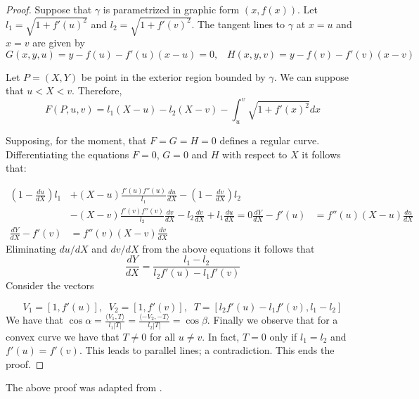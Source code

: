 \begin{proof}
Suppose that $\gamma$ is parametrized in graphic
form $(x,f(x))$. Let $l_1=\sqrt{1+f'(u)^2}$ and
$l_2=\sqrt{1+f'(v)^2}$.
The tangent lines to $\gamma$ at $x=u$ and $x=v$
are given by
\[ G(x,y,u)=y-f(u)-f'(u)(x-u)=0,\;\;\; H(x,y,v)=y-f(v)-f'(v)(x-v)\]

Let $P=(X,Y)$ be  point in the exterior region bounded by $\gamma$. We can suppose that $u<X<v.$
Therefore, 
\[F(P,u,v)=l_1(X-u)-l_2(X-v)-\int_u^v \sqrt{1+f'(x)^2}dx \]

Supposing, for the moment,  that $F=G=H=0$ defines  a regular curve.  Differentiating the equations $F=0$, $G=0$ and $H$ with respect to $X$ it follows that:

\begin{align*}
(1-\frac{du}{dX})l_1 &+(X-u)\frac{f'(u)f''(u)}{l_1}\frac{du}{dX}-(1-\frac{dv}{dX})l_2\\
    &-(X-v)\frac{f'(v)f''(v)}{l_2}\frac{dv}{dX}-l_2\frac{dv}{dX}+l_1\frac{du}{dX}=0
    \frac{dY}{dX}-f'(u)&=f''(u)(X-u)\frac{du}{dX}\\
    \frac{dY}{dX}-f'(v)&=f''(v)(X-v)\frac{dv}{dX}
\end{align*}
Eliminating $du/dX$ and $dv/dX$ from the above equations   it follows that
\[\frac{dY}{dX}=\frac{l_1-l_2}{l_2f'(u)-l_1f'(v)}\]
Consider the vectors

\[V_1=[1,f'(u)],\;\; V_2=[1,f'(v)],\;\; 
T=[l_2f'(u)-l_1f'(v),l_1-l_2]\]
We have that
$\cos\alpha=\frac{\langle V_1,T\rangle}{l_1|T|}=\frac{\langle - V_2,- T\rangle}{l_2|T|}=\cos\beta$. Finally we observe that for a convex curve we have that $T\ne 0$ for all $u\ne v.$ In fact, $T=0$ only if   $l_1=l_2$ and $f'(u)=f'(v)$. This  leads to parallel lines; a contradiction. This ends the proof.
\end{proof}

\begin{remark}
The above proof   was adapted from \cite{miller-1925}.
\end{remark}

